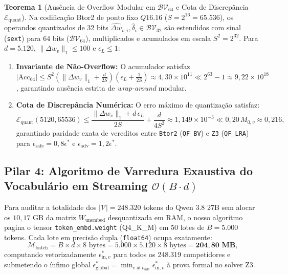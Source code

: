 \documentclass[11pt,a4paper]{article}
\theoremstyle{definition}
\newtheorem{theorem}{Teorema}
\begin{document}
\begin{theorem}[Ausência de Overflow Modular em $\mathcal{BV}_{64}$ e Cota de Discrepância $\mathcal{E}_{\text{quant}}$]
\label{thm:qwen_bv64}
Na codificação Btor2 de ponto fixo $Q16.16$ ($S = 2^{16} = 65.536$), os operandos quantizados de 32 bits $\widehat{\Delta w}_{v,i}, \hat{\delta}_i \in \mathcal{BV}_{32}$ são estendidos com sinal (\texttt{sext}) para 64 bits ($\mathcal{BV}_{64}$), multiplicados e acumulados em escala $S^2 = 2^{32}$. Para $d = 5.120$, $\|\Delta w_v\|_1 \le 100$ e $\epsilon_L \le 1$:
\begin{enumerate}
    \item \textbf{Invariante de Não-Overflow:} O acumulador satisfaz $|\mathrm{Acc}_{64}| \le S^2(\|\Delta w_v\|_1 + \frac{d}{2S})(\epsilon_L + \frac{1}{2S}) \approx 4{,}30 \times 10^{11} \ll 2^{63}-1 \approx 9{,}22 \times 10^{18}$, garantindo ausência estrita de \textit{wrap-around} modular.
    \item \textbf{Cota de Discrepância Numérica:} O erro máximo de quantização satisfaz:
    \begin{equation}
        \mathcal{E}_{\text{quant}}(5120, 65536) \le \frac{\|\Delta w_v\|_1 + d\,\epsilon_L}{2S} + \frac{d}{4S^2} \approx 1{,}149 \times 10^{-3} \ll 0{,}20\,M_{0,v} \approx 0{,}216,
    \end{equation}
    garantindo paridade exata de vereditos entre \texttt{Btor2} (\texttt{QF\_BV}) e \texttt{Z3} (\texttt{QF\_LRA}) para $\epsilon_{\text{safe}} = 0{,}8\epsilon^*$ e $\epsilon_{\text{adv}} = 1{,}2\epsilon^*$.
\end{enumerate}
\end{theorem}

\subsection{Pilar 4: Algoritmo de Varredura Exaustiva do Vocabulário em Streaming \texorpdfstring{$\mathcal{O}(B \cdot d)$}{O(B d)}}

Para auditar a totalidade dos $|\mathcal{V}| = 248.320$ tokens do Qwen 3.8 27B sem alocar os $10{,}17\text{ GB}$ da matriz $W_{\text{unembed}}$ desquantizada em RAM, o nosso algoritmo pagina o tensor \texttt{token\_embd.weight} (Q4\_K\_M) em 50 lotes de $B = 5.000$ tokens. Cada lote em precisão dupla (\texttt{float64}) ocupa exatamente:
\begin{equation}
    \mathcal{M}_{\text{batch}} = B \times d \times 8\text{ bytes} = 5.000 \times 5.120 \times 8\text{ bytes} = \mathbf{204{,}80\text{ MB}},
\end{equation}
computando vetorizadamente $\epsilon_{\text{in},v}^*$ para todos os 248.319 competidores e submetendo o ínfimo global $\epsilon_{\text{global}}^* = \min_{v \neq t_{\text{safe}}} \epsilon_{\text{in},v}^*$ à prova formal no solver Z3.
\end{document}
